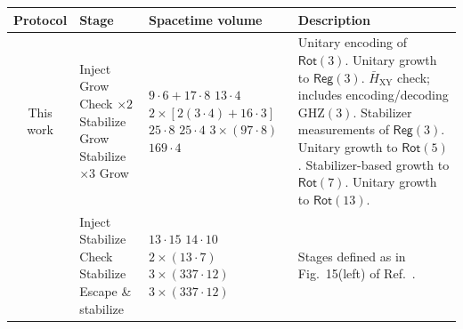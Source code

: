 \documentclass[%
    aps, 
    physrev,
    reprint,
]{revtex4-2}
\newcommand{\rot}[1]{\mathsf{Rot}(#1)}
\newcommand{\reg}[1]{\mathsf{Reg}(#1)}
\newcommand{\GHZ}[1]{\text{GHZ}(#1)}
\newcommand{\XY}{_\mathrm{XY}}
\begin{document}
\begin{table}
\centering
    \begin{tabular}{|c|l|l|l|}
    \hline
    \textbf{Protocol} & \textbf{Stage} & \textbf{Spacetime volume} & \textbf{Description} \\ \hline
    \makecell[c]{This \\ work} &
    \makecell[l]{Inject \\
                Grow \\
                Check $\times2$ \\
                Stabilize \\
                Grow \\
                Stabilize $\times3$ \\
                Grow
                } &
    \makecell[l]{$9\cdot 6 + 17\cdot 8$ \\
                $13\cdot 4$ \\
                $2\times [2(3\cdot 4)+16\cdot 3]$ \\
                $25\cdot 8$ \\
                $25\cdot 4$ \\
                $3\times (97\cdot 8)$ \\
                $169\cdot 4$
                } &
    \makecell[l]{Unitary encoding of $\rot3$. \\
                Unitary growth to $\reg3$. \\
                $\bar{H}\XY$ check; includes encoding/decoding $\GHZ{3}$. \\ 
                Stabilizer measurements of $\reg3$. \\ 
                Unitary growth to $\rot5$. \\ 
                Stabilizer-based growth to $\rot7$.  \\
                Unitary growth to $\rot{13}$.
                } \\ \hline
   ~\cite{gidney2024magic} & 
    \makecell[l]{Inject \\
                Stabilize \\
                Check \\
                Stabilize \\
                Escape \& stabilize
                } &
    \makecell[l]{$13\cdot 15$ \\
                $14\cdot 10$ \\
                $2\times (13\cdot 7)$ \\
                $3\times (337 \cdot 12)$ \\
                $3\times (337 \cdot 12)$
                } &
    Stages defined as in Fig.~15(left) of Ref.~\cite{gidney2024magic}.\\ \hline       
    

\end{tabular}
\end{table}
\end{document}
